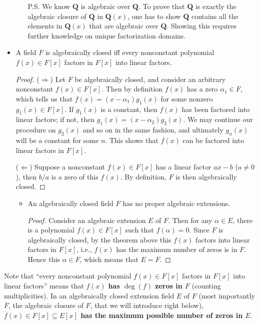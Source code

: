 \documentclass[11pt]{article}
\newcommand{\Q}{\mathbf{Q}}
\newcommand{\clos}[1]{\overline{#1}}
\renewcommand{\implies}{\Rightarrow}
\renewcommand{\impliedby}{\Leftarrow}
\begin{document}
\begin{itemize}
\begin{itemize}
        P.S. We know $\Q$ is algebraic over $\Q$. To prove that $\Q$ is exactly the algebraic closure of $\Q$ in $\Q(x)$, one has to show $\Q$ contains all the elements in $\Q(x)$ that are algebraic over $\Q$. Showing this requires further knowledge on unique factorization domains.
    \end{itemize}
    \item A field $F$ is algebraically closed iff every nonconstant polynomial $f(x) \in F[x]$ factors in $F[x]$ into linear factors.
    \begin{proof}
        ($\implies$) Let $F$ be algebraically closed, and consider an arbitrary nonconstant $f(x) \in F[x]$. Then by definition $f(x)$ has a zero $\alpha_1 \in F$, which tells us that $f(x) = (x-\alpha_1) g_1(x)$ for some nonzero $g_1(x) \in F[x]$. If $g_1(x)$ is a constant, then $f(x)$ has been factored into linear factors; if not, then $g_1(x) = (x - \alpha_2) g_2(x)$. We may continue our procedure on $g_2(x)$ and so on in the same fashion, and ultimately $g_n(x)$ will be a constant for some $n$. This shows that $f(x)$ can be factored into linear factors in $F[x]$.

        ($\impliedby$) Suppose a nonconstant $f(x) \in F[x]$ has a linear factor $ax-b$ ($a \neq 0$), then $b/a$ is a zero of this $f(x)$. By definition, $F$ is then algebraically closed.
    \end{proof}
    \begin{itemize}
        \item An algebraically closed field $F$ has no proper algebraic extensions.
        \begin{proof}
            Consider an algebraic extension $E$ of $F$. Then for any $\alpha \in E$, there is a polynomial $f(x) \in F[x]$ such that $f(\alpha) = 0$. Since $F$ is algebraically closed, by the theorem above this $f(x)$ factors into linear factors in $F[x]$, i.e., $f(x)$ has the maximum number of zeros is in $F$. Hence this $\alpha \in F$, which means that $E = F$.
        \end{proof}
    \end{itemize}
\end{itemize}
\begin{framed}
    Note that ``every nonconstant polynomial $f(x) \in F[x]$ factors in $F[x]$ into linear factors'' means that $f(x)$ \textbf{has $\deg(f)$ zeros in $F$} (counting multiplicities). In an algebraically closed extension field $E$ of $F$ (most importantly $\clos{F}$, the algebraic closure of $F$, that we will introduce right below), \textbf{$f(x) \in F[x] \subseteq E[x]$ has the maximum possible number of zeros in $E$}.
\end{framed}
\end{document}
